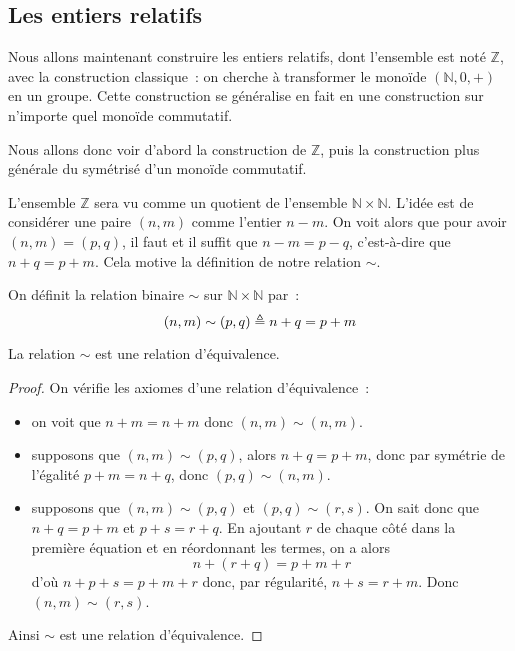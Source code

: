 \subsection{Les entiers relatifs}

Nous allons maintenant construire les entiers relatifs, dont l'ensemble est
noté $\mathbb Z$, avec la construction classique~: on cherche à transformer
le monoïde $(\mathbb N,0,+)$ en un groupe. Cette construction se généralise
en fait en une construction sur n'importe quel monoïde commutatif.

Nous allons donc voir d'abord la construction de $\mathbb Z$, puis la
construction plus générale du symétrisé d'un monoïde commutatif.

L'ensemble $\mathbb Z$ sera vu comme un quotient de l'ensemble
$\mathbb N \times \mathbb N$. L'idée est de considérer une paire $(n,m)$ comme
l'entier $n - m$. On voit alors que pour avoir $(n,m) = (p,q)$, il faut et il
suffit que $n - m = p - q$, c'est-à-dire que $n + q = p + m$. Cela motive la
définition de notre relation $\sim$.

\begin{definition}
  On définit la relation binaire $\sim$ sur $\mathbb N \times \mathbb N$ par~:
  \[(n,m)\sim (p,q) \triangleq n + q = p + m\]
\end{definition}

\begin{proposition}
  La relation $\sim$ est une relation d'équivalence.
\end{proposition}

\begin{proof}
  On vérifie les axiomes d'une relation d'équivalence~:
  \begin{itemize}
  \item on voit que $n+m=n+m$ donc $(n,m)\sim (n,m)$.
  \item supposons que $(n,m) \sim (p,q)$, alors $n + q = p + m$, donc par
    symétrie de l'égalité $p + m = n + q$, donc $(p,q)\sim (n,m)$.
  \item supposons que $(n,m)\sim(p,q)$ et $(p,q)\sim (r,s)$. On sait donc que
    $n + q = p + m$ et $p + s = r + q$. En ajoutant $r$ de chaque côté dans
    la première équation et en réordonnant les termes, on a alors
    \[n + (r + q) = p + m + r\]
    d'où $n + p + s = p + m + r$ donc, par régularité, $n + s = r + m$.
    Donc $(n,m)\sim(r,s)$.
  \end{itemize}
  Ainsi $\sim$ est une relation d'équivalence.
\end{proof}

